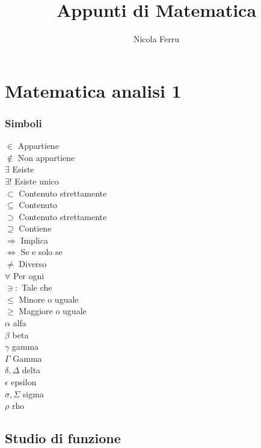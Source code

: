 \documentclass{book}
\title{Appunti di Matematica}
\author{Nicola Ferru}
\date{}
\begin{document}
\maketitle
\tableofcontents
\part{Matematica analisi 1}
\section{Simboli}
\begin{multicols}{3}
 $\in$ Appartiene\\
 $\notin$ Non appartiene\\
 $\exists$ Esiste\\
 $\exists !$ Esiste unico\\
 $\subset$ Contenuto strettamente\\
 $\subseteq$ Contenuto\\
 $\supset$ Contenuto strettamente\\
 $\supseteq$ Contiene\\
$\Rightarrow$ Implica\\
$\Longleftrightarrow$ Se e solo se\\
$\neq$ Diverso\\
$\forall$ Per ogni\\
$\ni :$ Tale che\\
$\leq$ Minore o uguale\\
$\geq$ Maggiore o uguale\\
$\alpha$ alfa\\
$\beta$ beta\\
$\gamma$ gamma\\
$\Gamma$ Gamma\\
$\delta,\Delta$ delta\\
$\epsilon$ epsilon\\
$\sigma,\Sigma$ sigma\\
$\rho$ rho
\end{multicols}
\chapter{Studio di funzione}
\end{document}
